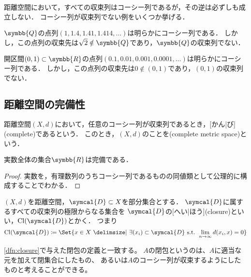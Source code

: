 \documentclass[../sotsu.tex]{subfiles}
\begin{document}
距離空間において，すべての収束列はコーシー列であるが，その逆は必ずしも成立しない．
コーシー列が収束列でない例をいくつか挙げる．

\begin{example}
    $\symbb{Q}$の点列$(1, 1.4, 1.41, 1.414, \dotsc)$は明らかにコーシー列である．
    しかし，この点列の収束先は$\sqrt{2} \notin \symbb{Q}$であり，$\symbb{Q}$の収束列でない．
\end{example}

\begin{example}
    開区間$(0, 1) \subset \symbb{R}$の点列$(0.1, 0.01, 0.001, 0.0001, \dotsc)$は明らかにコーシー列である．
    しかし，この点列の収束先は$0 \notin (0, 1)$であり，$(0, 1)$の収束列でない．
\end{example}


\subsection{距離空間の完備性}

\begin{definition}
    距離空間$(X, d)$において，任意のコーシー列が収束列であるとき，[かん|び](complete)であるという．
    このとき，$(X, d)$のことを(complete metric space)という．
\end{definition}

\begin{proposition}[実数の完備性]
    実数全体の集合$\symbb{R}$は完備である．
\end{proposition}

\begin{proof}
    実数を，有理数列のうちコーシー列であるものの同値類として公理的に構成することでわかる．
\end{proof}

\begin{definition}[点列による閉包の定義]
    \label{dfn:closure-by-sequence}
    $(X, d)$を距離空間，$\symcal{D} \subset X$を部分集合とする．
    $\symcal{D}$に属するすべての収束列の極限からなる集合を
    $\symcal{D}$の[へい|ほう](closure)といい，$\cl{\symcal{D}}$とかく．
    つまり
    \begin{equation}
        \cl{\symcal{D}} \coloneq \Set{ x \in X  \given  \exists (x_i) \subset \symcal{D} \text{ s.t. } \lim_{n \to \infty} d(x_i, x) = 0 }
    \end{equation}
\end{definition}

\cref{dfn:closure}で与えた閉包の定義と一致する。
$A$の閉包というのは、$A$に適当な元を加えて閉集合にしたもの、
あるいは$A$のコーシー列が収束するようにしたものと考えることができる。
\end{document}
